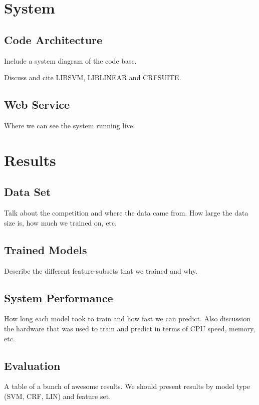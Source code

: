 \documentclass[preprint]{style}
\begin{document}
\section{System}

\subsection{Code Architecture}

Include a system diagram of the code base.

Discuss and cite LIBSVM, LIBLINEAR and CRFSUITE.

\subsection{Web Service}

Where we can see the system running live.


\section{Results}

\subsection{Data Set}

Talk about the competition and where the data came from. How large the data size is, how much we trained on, etc.

\subsection{Trained Models}

Describe the different feature-subsets that we trained and why.


\subsection{System Performance}

How long each model took to train and how fast we can predict. Also discussion the hardware that was used to train and predict in terms of CPU speed, memory, etc.

\subsection{Evaluation}

A table of a bunch of awesome results. We should present results by model type (SVM, CRF, LIN) and feature set.
\end{document}
